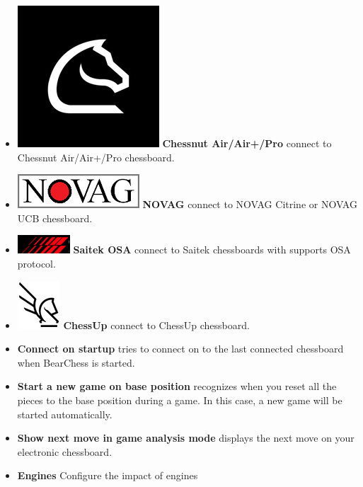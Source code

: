 \documentclass[11pt,a4paper]{article}
\begin{document}
\begin{itemize}
	\item  \includegraphics[scale=0.1]{chessnut.png} \textbf{Chessnut Air/Air+/Pro} connect to Chessnut Air/Air+/Pro chessboard.		
	\item  \includegraphics[scale=0.3]{novag48.PNG} \textbf{NOVAG} connect to NOVAG Citrine or NOVAG UCB chessboard.			
    \item  \includegraphics[scale=0.4]{Saitek_logo.PNG} \textbf{Saitek OSA} connect to Saitek chessboards with supports OSA protocol.		
    \item  \includegraphics[scale=0.4]{ChessUp.png} \textbf{ChessUp} connect to ChessUp chessboard.
	\item \textbf{Connect on startup} tries to connect on to the last connected chessboard when BearChess is started. 	
	\item \textbf{Start a new game on base position} recognizes when you reset all the pieces to the base position during a game. In this case, a new game will be started automatically.
    \item \textbf{Show next move in game analysis mode} displays the next move on your electronic chessboard.
    \item \textbf{Engines} Configure the impact of engines

\end{itemize}
\end{document}
